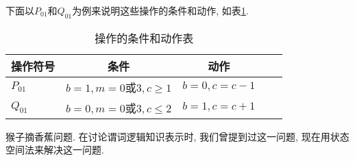 \begin{result}
下面以$P_{01}$和$Q_{01}$为例来说明这些操作的条件和动作, 如表\ref{Tabexam4.1}.
\begin{table}
\begin{center}
\caption{操作的条件和动作表}
\label{Tabexam4.1}
\begin{tabular}{lcccc}
\hline
操作符号                  &  条件                                                                              &  动作\\
\hline
$P_{01}$     &  $b=1, m=0$或$3, c\geq 1$        &  $b=0, c=c-1$\\
$Q_{01}$     &  $b=0, m=0$或$3, c\leq 2 $         &  $b=1, c=c+1$\\
\hline
\end{tabular}
\end{center}
\end{table}
\end{result}
\begin{example}
  猴子摘香蕉问题. 在讨论谓词逻辑知识表示时, 我们曾提到过这一问题, 现在用状态空间法来解决这一问题.
\end{example}

